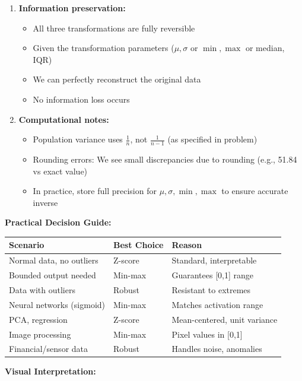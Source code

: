 \documentclass[12pt]{article}
\begin{document}
\begin{explanation}
\begin{enumerate}
    \item \textbf{Information preservation:}
    \begin{itemize}
        \item All three transformations are fully reversible
        \item Given the transformation parameters (\(\mu, \sigma\) or \(\min, \max\) or median, IQR)
        \item We can perfectly reconstruct the original data
        \item No information loss occurs
    \end{itemize}

    \item \textbf{Computational notes:}
    \begin{itemize}
        \item Population variance uses \(\frac{1}{n}\), not \(\frac{1}{n-1}\) (as specified in problem)
        \item Rounding errors: We see small discrepancies due to rounding (e.g., 51.84 vs exact value)
        \item In practice, store full precision for \(\mu, \sigma, \min, \max\) to ensure accurate inverse
    \end{itemize}
\end{enumerate}

\textbf{Practical Decision Guide:}

\begin{center}
\begin{tabular}{|l|l|l|}
\hline
\textbf{Scenario} & \textbf{Best Choice} & \textbf{Reason} \\
\hline
Normal data, no outliers & Z-score & Standard, interpretable \\
Bounded output needed & Min-max & Guarantees [0,1] range \\
Data with outliers & Robust & Resistant to extremes \\
Neural networks (sigmoid) & Min-max & Matches activation range \\
PCA, regression & Z-score & Mean-centered, unit variance \\
Image processing & Min-max & Pixel values in [0,1] \\
Financial/sensor data & Robust & Handles noise, anomalies \\
\hline
\end{tabular}
\end{center}

\textbf{Visual Interpretation:}


\end{explanation}
\end{document}
